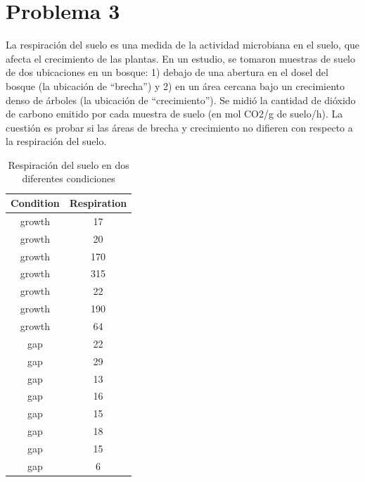 \documentclass[a4paper,12pt]{article} %
\begin{document}
\section*{Problema 3}
La respiración del suelo es una medida de la actividad microbiana en el suelo, que afecta el crecimiento de las plantas. En un estudio, se tomaron muestras de suelo de dos ubicaciones en un bosque: 1) debajo de una abertura en el dosel del bosque (la ubicación de “brecha”) y 2) en un área cercana bajo un crecimiento denso de árboles (la ubicación de “crecimiento”). Se midió la cantidad de dióxido de carbono emitido por cada muestra de suelo (en mol CO2/g de suelo/h). La cuestión es probar si las áreas de brecha y crecimiento no difieren con respecto a la respiración del suelo.
\begin{center}
	\begin{table}[H]
	\centering
	\begin{tabular}{|c|c|} \hline
		\textbf{Condition}&\textbf{Respiration} \\ \hline
		growth&17\\
		growth&20\\
		growth&170\\
		growth&315\\
		growth&22\\
		growth&190\\
		growth&64\\
		gap&22\\
		gap&29\\
		gap&13\\
		gap&16\\
		gap&15\\
		gap&18\\
		gap&15\\
		gap&6\\ \hline
	\end{tabular}
	\caption{Respiración del suelo en dos diferentes condiciones}
	\label{tab:my_label3}
\end{table}
\end{center}
\end{document}
